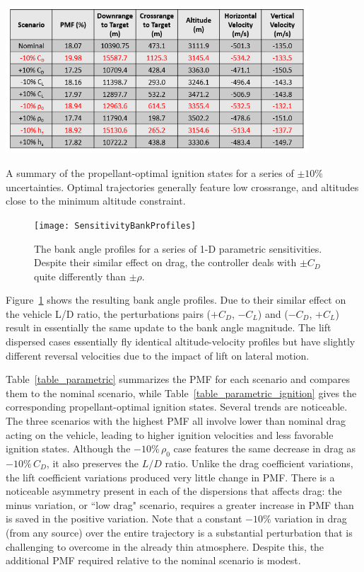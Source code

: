 \documentclass[letterpaper, paper,11pt]{AAS}
\begin{document}
\begin{table}[h!]
	\centering
	\includegraphics[width=0.85\textwidth]{ParametricSensitivityIgnitionTable} 
	\caption{A summary of the propellant-optimal ignition states for a series of $\pm10\%$ uncertainties. Optimal trajectories generally feature low crossrange, and altitudes close to the minimum altitude constraint.}
	\label{table_parametric_ignition}
\end{table}
\begin{figure}[h!]
	\centering
	\texttt{[image: SensitivityBankProfiles]} 
	\caption{The bank angle profiles for a series of 1-D parametric sensitivities. Despite their similar effect on drag, the controller deals with $\pm C_D$ quite differently than $\pm \rho$.}
	\label{fig_parametric_bank}
\end{figure}

Figure~\ref{fig_parametric_bank} shows the resulting bank angle profiles. Due to their similar effect on the vehicle L/D ratio, the perturbations pairs  ($ +C_D $, $ -C_L $) and ($ -C_D $, $ +C_L $) result in essentially the same update to the bank angle magnitude. The lift dispersed cases essentially fly identical altitude-velocity profiles but have slightly different reversal velocities due to the impact of lift on lateral motion. 

Table~\ref{table_parametric} summarizes the PMF for each scenario and compares them to the nominal scenario, while Table~\ref{table_parametric_ignition} gives the corresponding propellant-optimal ignition states. Several trends are noticeable. The three scenarios with the highest PMF all involve lower than nominal drag acting on the vehicle, leading to higher ignition velocities and less favorable ignition states. Although the $-10\%\, \rho_0$ case features the same decrease in drag as $-10\%\,C_D$, it also preserves the $L/D$ ratio. Unlike the drag coefficient variations, the lift coefficient variations produced very little change in PMF.
There is a noticeable asymmetry present in each of the dispersions that affects drag: the minus variation, or ``low drag" scenario, requires a greater increase in PMF than is saved in the positive variation. Note that a constant $-10\%$ variation in drag (from any source) over the entire trajectory is a substantial perturbation that is challenging to overcome in the already thin atmosphere. Despite this, the additional PMF required relative to the nominal scenario is modest.
\end{document}
